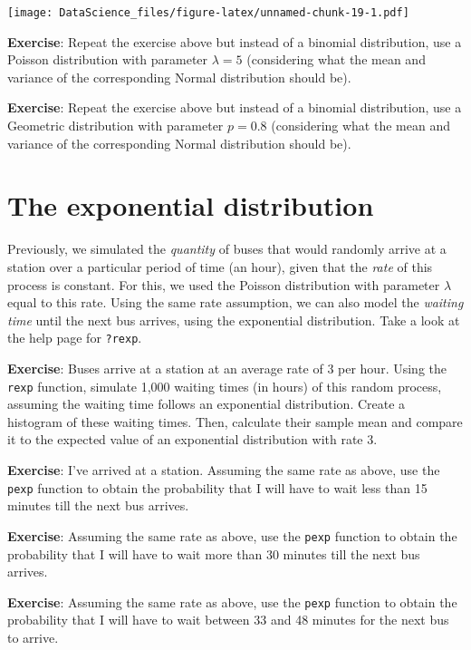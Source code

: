\documentclass[
]{book}
\begin{document}
\texttt{[image: DataScience\_files/figure-latex/unnamed-chunk-19-1.pdf]}

\textbf{Exercise}: Repeat the exercise above but instead of a binomial
distribution, use a Poisson distribution with parameter \(\lambda=5\) (considering what the mean and variance of the corresponding Normal distribution should be).

\textbf{Exercise}: Repeat the exercise above but instead of a binomial distribution, use a Geometric distribution with parameter \(p=0.8\) (considering what the mean and variance of the corresponding Normal distribution should be).

\hypertarget{the-exponential-distribution}{%
\section{The exponential distribution}\label{the-exponential-distribution}}

Previously, we simulated the \emph{quantity} of buses that would randomly arrive at a station over a particular period of time (an hour), given that the \emph{rate} of this process is constant. For this, we used the Poisson distribution with parameter \(\lambda\) equal to this rate. Using the same rate assumption, we can also model the \emph{waiting time} until the next bus arrives, using the exponential distribution. Take a look at the help page for \texttt{?rexp}.

\textbf{Exercise}: Buses arrive at a station at an average rate of 3 per hour. Using the \texttt{rexp} function, simulate 1,000 waiting times (in hours) of this random process, assuming the waiting time follows an exponential distribution. Create a histogram of these waiting times. Then, calculate their sample mean and compare it to the expected value of an exponential distribution with rate 3.

\textbf{Exercise}: I've arrived at a station. Assuming the same rate as above, use the \texttt{pexp} function to obtain the probability that I will have to wait less than 15 minutes till the next bus arrives.

\textbf{Exercise}: Assuming the same rate as above, use the \texttt{pexp} function to obtain the probability that I will have to wait more than 30 minutes till the next bus arrives.

\textbf{Exercise}: Assuming the same rate as above, use the \texttt{pexp} function to obtain the probability that I will have to wait between 33 and 48 minutes for the next bus to arrive.
\end{document}
